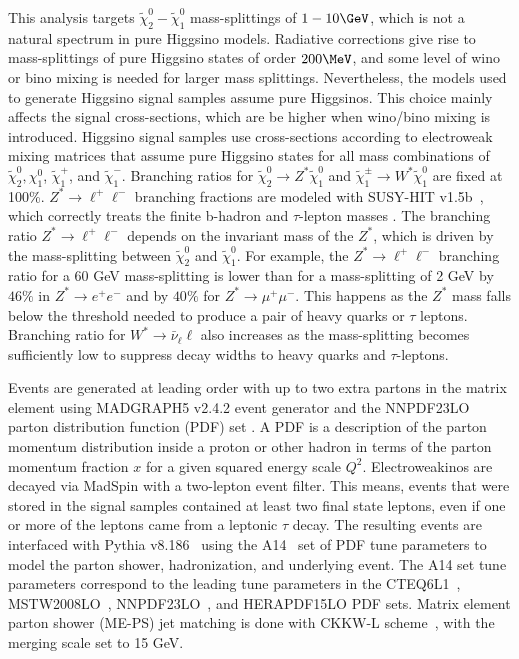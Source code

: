 This analysis targets $\tilde\chi_2^0-\tilde\chi_1^0$ mass-splittings of $1-10\GeV$, which is not a natural spectrum in pure Higgsino models.  Radiative corrections give rise to mass-splittings of pure Higgsino states of order $200\MeV$, and some level of wino or bino mixing is needed for larger mass splittings.  Nevertheless, the models used to generate Higgsino signal samples assume pure Higgsinos.  This choice mainly affects the signal cross-sections, which are be higher when wino/bino mixing is introduced.  Higgsino signal samples use cross-sections according to electroweak mixing matrices that assume pure Higgsino states for all mass combinations of $\tilde\chi_2^0, \chi_1^0$, $\tilde\chi_1^+$, and $\tilde\chi_1^-$.  Branching ratios for $\tilde\chi_2^0 \rightarrow Z^*\tilde\chi_1^0$ and $\tilde\chi_1^\pm \rightarrow W^* \tilde\chi_1^0$ are fixed at 100\%.  $Z^*\rightarrow \ell^+\ell^-$ branching fractions are modeled with SUSY-HIT v1.5b~\cite{spira}, which correctly treats the finite b-hadron and $\tau$-lepton masses \cite{spira}.  
The branching ratio $Z^* \rightarrow \ell^+\ell^-$ depends on the invariant mass of the $Z^*$, which is driven by the mass-splitting between $\tilde\chi^0_2$ and $\tilde\chi^0_1$.  For example, the $Z^* \rightarrow \ell^+\ell^-$ branching ratio for a 60 GeV mass-splitting is lower than for a mass-splitting of 2 GeV by  $46\%$ in $Z^* \rightarrow e^+e^-$ and by $40\%$ for $Z^* \rightarrow \mu^+\mu^-$.  This happens as the $Z^*$ mass falls below the threshold needed to produce a pair of heavy quarks or $\tau$ leptons.  Branching ratio for $W^* \rightarrow \bar{\nu}_\ell \ell$ also increases as the mass-splitting becomes sufficiently low to suppress decay widths to heavy quarks and $\tau$-leptons. %

Events are generated at leading order with up to two extra partons in the matrix element using MADGRAPH5 v2.4.2 event generator \cite{alwall} and the NNPDF23LO parton distribution function (PDF) set \cite{ball}.   A PDF is a description of the parton momentum distribution inside a proton or other hadron in terms of the parton momentum fraction $x$ for a given squared energy scale $Q^2$.   Electroweakinos are decayed via MadSpin \cite{1126-6708-2007-04-081, Artoisenet2013} with a two-lepton event filter.  This means, events that were stored in the signal samples contained at least two final state leptons, even if one or more of the leptons came from a leptonic $\tau$ decay.  The resulting events are interfaced with Pythia v8.186~\cite{pythia} using the A14~\cite{a14} set of PDF tune parameters to model the parton shower, hadronization, and underlying event.  The A14 set tune parameters correspond to the leading tune parameters in the CTEQ6L1~\cite{Pumplin:2002vw}, MSTW2008LO~\cite{Watt:2012tq}, NNPDF23LO~\cite{ball}, and HERAPDF15LO PDF sets.  Matrix element parton shower (ME-PS) jet matching is done with CKKW-L scheme~\cite{ckkwl}, with the merging scale set to 15 GeV.  

